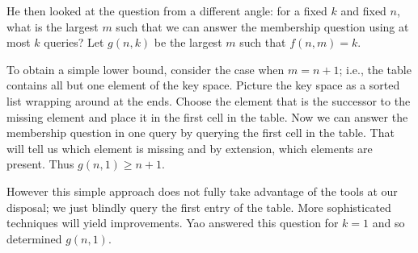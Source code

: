 He then looked at the question from a different angle: for a fixed $k$ and fixed $n$, what is the largest $m$ such that we can answer the membership question using at most $k$ queries? Let $g\left(n,k\right)$ be the largest $m$ such that $f\left(n,m\right) = k$.

To obtain a simple lower bound, consider the case when $m = n+1$; i.e., the table contains all but one element of the key space. Picture the key space as a sorted list wrapping around at the ends. Choose the element that is the successor to the missing element and place it in the first cell in the table. Now we can answer the membership question in one query by querying the first cell in the table. That will tell us which element is missing and by extension, which elements are present. Thus $g\left(n,1\right) \geq n+1$.

However this simple approach does not fully take advantage of the tools at our disposal; we just blindly query the first entry of the table. More sophisticated techniques will yield improvements. Yao answered this question for $k=1$ and so determined $g\left(n,1\right)$.

